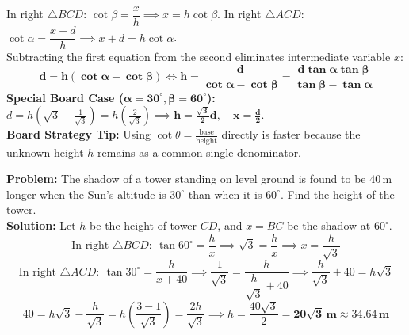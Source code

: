 \documentclass[10pt,a4paper]{article}
\begin{document}
\vspace{0.8mm}
\begin{formulaBox}[title=Master Derivation for Moving Observer / Shadow Lengthening,fonttitle=\bfseries\color{navy}]
  In right $\triangle BCD$: $\cot \beta = \dfrac{x}{h} \implies x = h\cot\beta$. \quad In right $\triangle ACD$: $\cot \alpha = \dfrac{x + d}{h} \implies x + d = h\cot\alpha$. \\
  Subtracting the first equation from the second eliminates intermediate variable $x$:
  $$\mathbf{d = h(\cot \alpha - \cot \beta) \iff h = \frac{d}{\cot \alpha - \cot \beta} = \frac{d\tan\alpha\tan\beta}{\tan\beta - \tan\alpha}}$$
  \textbf{Special Board Case ($\mathbf{\alpha = 30^\circ, \beta = 60^\circ}$):}
  $d = h\left(\sqrt{3} - \frac{1}{\sqrt{3}}\right) = h\left(\frac{2}{\sqrt{3}}\right) \implies \mathbf{h = \frac{\sqrt{3}}{2}d}, \quad \mathbf{x = \frac{d}{2}}$. \\
  \textbf{Board Strategy Tip:} Using $\cot\theta = \frac{\text{base}}{\text{height}}$ directly is faster because the unknown height $h$ remains as a common single denominator.
\end{formulaBox}

\vspace{0.5mm}
\begin{conceptBox}[title=Worked Board Archetype: Shadow Lengthening by 40 Meters,fonttitle=\bfseries\color{navy}]
  \textbf{Problem:} The shadow of a tower standing on level ground is found to be $40\,\text{m}$ longer when the Sun's altitude is $30^\circ$ than when it is $60^\circ$. Find the height of the tower. \\
  \textbf{Solution:} Let $h$ be the height of tower $CD$, and $x = BC$ be the shadow at $60^\circ$.
  $$\text{In right }\triangle BCD:\ \tan 60^\circ = \frac{h}{x} \implies \sqrt{3} = \frac{h}{x} \implies x = \frac{h}{\sqrt{3}}$$
  $$\text{In right }\triangle ACD:\ \tan 30^\circ = \frac{h}{x + 40} \implies \frac{1}{\sqrt{3}} = \frac{h}{\dfrac{h}{\sqrt{3}} + 40} \implies \frac{h}{\sqrt{3}} + 40 = h\sqrt{3}$$
  $$40 = h\sqrt{3} - \frac{h}{\sqrt{3}} = h\left(\frac{3 - 1}{\sqrt{3}}\right) = \frac{2h}{\sqrt{3}} \implies h = \frac{40\sqrt{3}}{2} = \mathbf{20\sqrt{3}\,\text{m}} \approx \mathbf{34.64\,\text{m}}$$
\end{conceptBox}

\newpage

\thispagestyle{fancy}
\vspace*{0mm}
\end{document}
